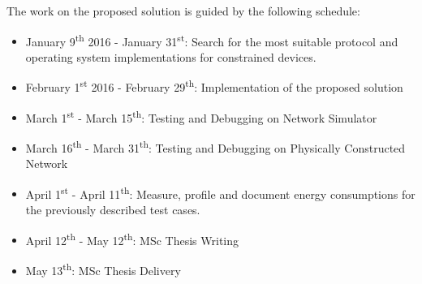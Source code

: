 The work on the proposed solution is guided by the following schedule:

\begin{itemize}
	\item January 9\textsuperscript{th} 2016 - January 31\textsuperscript{st}: Search for the most suitable protocol and operating system implementations for constrained devices.
	\item February 1\textsuperscript{st} 2016 - February 29\textsuperscript{th}: Implementation of the proposed solution
	\item March 1\textsuperscript{st} - March 15\textsuperscript{th}: Testing and Debugging on Network Simulator
	\item March 16\textsuperscript{th} - March 31\textsuperscript{th}: Testing and Debugging on Physically Constructed Network
	\item April 1\textsuperscript{st} - April 11\textsuperscript{th}: Measure, profile and document energy consumptions for the previously described test cases.
	\item April 12\textsuperscript{th} - May 12\textsuperscript{th}: MSc Thesis Writing
	\item May 13\textsuperscript{th}: MSc Thesis Delivery
\end{itemize}